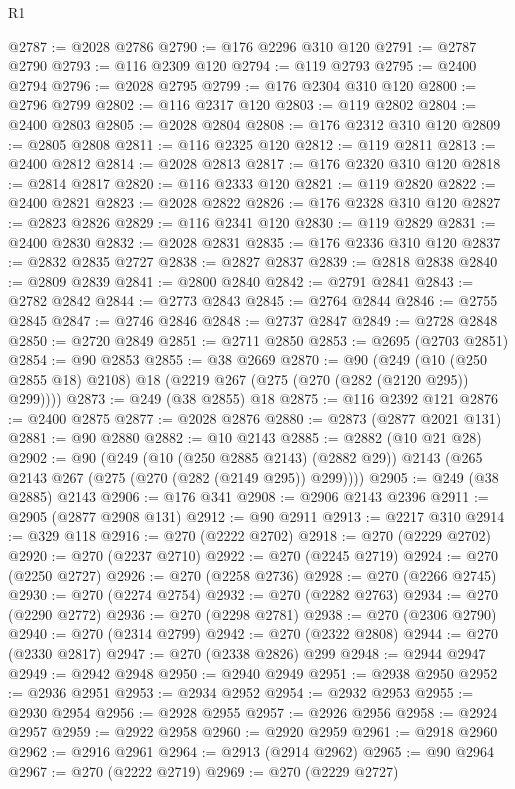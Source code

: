\begin{lexlean}{R1}
\begin{coremodule}
@2787 := @2028 @2786
@2790 := @176 @2296 @310 @120
@2791 := @2787 @2790
@2793 := @116 @2309 @120
@2794 := @119 @2793
@2795 := @2400 @2794
@2796 := @2028 @2795
@2799 := @176 @2304 @310 @120
@2800 := @2796 @2799
@2802 := @116 @2317 @120
@2803 := @119 @2802
@2804 := @2400 @2803
@2805 := @2028 @2804
@2808 := @176 @2312 @310 @120
@2809 := @2805 @2808
@2811 := @116 @2325 @120
@2812 := @119 @2811
@2813 := @2400 @2812
@2814 := @2028 @2813
@2817 := @176 @2320 @310 @120
@2818 := @2814 @2817
@2820 := @116 @2333 @120
@2821 := @119 @2820
@2822 := @2400 @2821
@2823 := @2028 @2822
@2826 := @176 @2328 @310 @120
@2827 := @2823 @2826
@2829 := @116 @2341 @120
@2830 := @119 @2829
@2831 := @2400 @2830
@2832 := @2028 @2831
@2835 := @176 @2336 @310 @120
@2837 := @2832 @2835 @2727
@2838 := @2827 @2837
@2839 := @2818 @2838
@2840 := @2809 @2839
@2841 := @2800 @2840
@2842 := @2791 @2841
@2843 := @2782 @2842
@2844 := @2773 @2843
@2845 := @2764 @2844
@2846 := @2755 @2845
@2847 := @2746 @2846
@2848 := @2737 @2847
@2849 := @2728 @2848
@2850 := @2720 @2849
@2851 := @2711 @2850
@2853 := @2695 (@2703 @2851)
@2854 := @90 @2853
@2855 := @38 @2669
@2870 := @90
    (@249 (@10 (@250 @2855 @18) @2108) @18 (@2219 @267 (@275 (@270 (@282 (@2120 @295)) @299))))
@2873 := @249 (@38 @2855) @18
@2875 := @116 @2392 @121
@2876 := @2400 @2875
@2877 := @2028 @2876
@2880 := @2873 (@2877 @2021 @131)
@2881 := @90 @2880
@2882 := @10 @2143
@2885 := @2882 (@10 @21 @28)
@2902 := @90
    (@249
      (@10 (@250 @2885 @2143) (@2882 @29))
      @2143
      (@265 @2143 @267 (@275 (@270 (@282 (@2149 @295)) @299))))
@2905 := @249 (@38 @2885) @2143
@2906 := @176 @341
@2908 := @2906 @2143 @2396
@2911 := @2905 (@2877 @2908 @131)
@2912 := @90 @2911
@2913 := @2217 @310
@2914 := @329 @118
@2916 := @270 (@2222 @2702)
@2918 := @270 (@2229 @2702)
@2920 := @270 (@2237 @2710)
@2922 := @270 (@2245 @2719)
@2924 := @270 (@2250 @2727)
@2926 := @270 (@2258 @2736)
@2928 := @270 (@2266 @2745)
@2930 := @270 (@2274 @2754)
@2932 := @270 (@2282 @2763)
@2934 := @270 (@2290 @2772)
@2936 := @270 (@2298 @2781)
@2938 := @270 (@2306 @2790)
@2940 := @270 (@2314 @2799)
@2942 := @270 (@2322 @2808)
@2944 := @270 (@2330 @2817)
@2947 := @270 (@2338 @2826) @299
@2948 := @2944 @2947
@2949 := @2942 @2948
@2950 := @2940 @2949
@2951 := @2938 @2950
@2952 := @2936 @2951
@2953 := @2934 @2952
@2954 := @2932 @2953
@2955 := @2930 @2954
@2956 := @2928 @2955
@2957 := @2926 @2956
@2958 := @2924 @2957
@2959 := @2922 @2958
@2960 := @2920 @2959
@2961 := @2918 @2960
@2962 := @2916 @2961
@2964 := @2913 (@2914 @2962)
@2965 := @90 @2964
@2967 := @270 (@2222 @2719)
@2969 := @270 (@2229 @2727)

\end{coremodule}
\end{lexlean}

